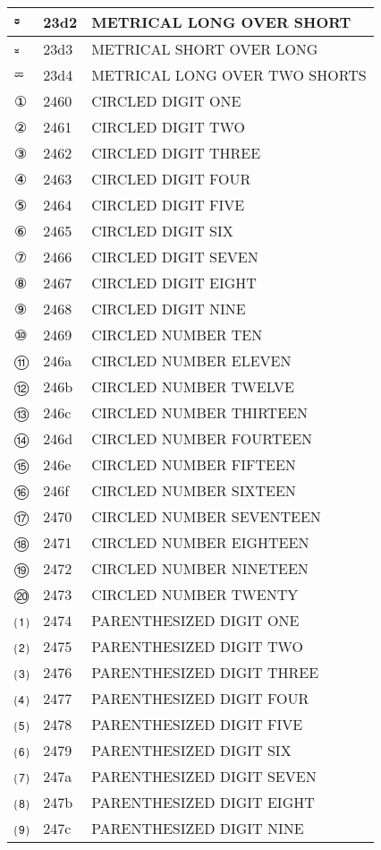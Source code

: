 \documentclass[12pt,letterpaper,openany]{book}
\begin{document}
\begin{center}
\begin{supertabular}{|m{0.25in}|m{0.5in}|m{4in}|}
⏒ & 23d2 & METRICAL LONG OVER SHORT\\\hline
⏓ & 23d3 & METRICAL SHORT OVER LONG\\\hline
⏔ & 23d4 & METRICAL LONG OVER TWO SHORTS\\\hline
① & 2460 & CIRCLED DIGIT ONE\\\hline
② & 2461 & CIRCLED DIGIT TWO\\\hline
③ & 2462 & CIRCLED DIGIT THREE\\\hline
④ & 2463 & CIRCLED DIGIT FOUR\\\hline
⑤ & 2464 & CIRCLED DIGIT FIVE\\\hline
⑥ & 2465 & CIRCLED DIGIT SIX\\\hline
⑦ & 2466 & CIRCLED DIGIT SEVEN\\\hline
⑧ & 2467 & CIRCLED DIGIT EIGHT\\\hline
⑨ & 2468 & CIRCLED DIGIT NINE\\\hline
⑩ & 2469 & CIRCLED NUMBER TEN\\\hline
⑪ & 246a & CIRCLED NUMBER ELEVEN\\\hline
⑫ & 246b & CIRCLED NUMBER TWELVE\\\hline
⑬ & 246c & CIRCLED NUMBER THIRTEEN\\\hline
⑭ & 246d & CIRCLED NUMBER FOURTEEN\\\hline
⑮ & 246e & CIRCLED NUMBER FIFTEEN\\\hline
⑯ & 246f & CIRCLED NUMBER SIXTEEN\\\hline
⑰ & 2470 & CIRCLED NUMBER SEVENTEEN\\\hline
⑱ & 2471 & CIRCLED NUMBER EIGHTEEN\\\hline
⑲ & 2472 & CIRCLED NUMBER NINETEEN\\\hline
⑳ & 2473 & CIRCLED NUMBER TWENTY\\\hline
⑴ & 2474 & PARENTHESIZED DIGIT ONE\\\hline
⑵ & 2475 & PARENTHESIZED DIGIT TWO\\\hline
⑶ & 2476 & PARENTHESIZED DIGIT THREE\\\hline
⑷ & 2477 & PARENTHESIZED DIGIT FOUR\\\hline
⑸ & 2478 & PARENTHESIZED DIGIT FIVE\\\hline
⑹ & 2479 & PARENTHESIZED DIGIT SIX\\\hline
⑺ & 247a & PARENTHESIZED DIGIT SEVEN\\\hline
⑻ & 247b & PARENTHESIZED DIGIT EIGHT\\\hline
⑼ & 247c & PARENTHESIZED DIGIT NINE\\\hline

\end{supertabular}
\end{center}
\end{document}
